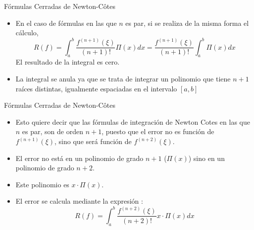 \documentclass[12pt]{beamer}
\begin{document}
\begin{frame}{F\'ormulas Cerradas de Newton-C\^otes}
  \begin{itemize}
    \item En el caso de fórmulas en las que $n$ es par, si se realiza de la misma forma el cálculo,
    $$
    R(f) = \int_{a}^{b}\dfrac{f^{(n+1)}(\xi)}{(n+1)!}\Pi(x)dx = \dfrac{f^{(n+1)}(\xi)}{(n+1)!}\int_{a}^{b}\Pi(x)dx
    $$
    El resultado de la integral es cero.
    \item<2-> La integral se anula ya que se trata de integrar un polinomio que tiene $n+1$ raíces distintas, igualmente
    espaciadas en el intervalo $[a,b]$
      \begin{center}  
\end{center}
  \end{itemize}
\end{frame}
\begin{frame}{F\'ormulas Cerradas de Newton-C\^otes}
  \begin{itemize}
    \item Esto quiere decir que las fórmulas de integración de Newton Cotes en las que $n$ es par, son de orden $n+1$, puesto que el error no es función de $f^{(n+1)}(  \xi)$, sino que será función de $f^{(n+2)}(\xi)$.
    \item<2-> El error no está en un polinomio de grado $n+1$ ($\Pi(x)$) sino en un polinomio de grado $n + 2$.
    \item<3-> Este polinomio es $x\cdot\Pi(x)$.
    \item<4->El error se calcula mediante la expresión :
    $$
    R(f) = \int_{a}^{b}\dfrac{f^{(n+2)}(\xi)}{(n+2)!}x\cdot\Pi(x)dx 
    $$    
  \end{itemize}      
\end{frame}
\end{document}
